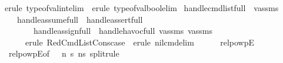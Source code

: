 \begin{isabellebody}
\ {\isacharparenleft}{\kern0pt}erule\ type{\isacharunderscore}{\kern0pt}of{\isacharunderscore}{\kern0pt}val{\isacharunderscore}{\kern0pt}int{\isacharunderscore}{\kern0pt}elim\ {\isacharbar}{\kern0pt}\ erule\ type{\isacharunderscore}{\kern0pt}of{\isacharunderscore}{\kern0pt}val{\isacharunderscore}{\kern0pt}bool{\isacharunderscore}{\kern0pt}elim{\isacharparenright}{\kern0pt}\isanewline
{\isacharparenright}{\kern0pt}\isanewline
\isanewline
{}\isamarkupfalse%
\ handle{\isacharunderscore}{\kern0pt}cmd{\isacharunderscore}{\kern0pt}list{\isacharunderscore}{\kern0pt}full\ \ v{\isacharunderscore}{\kern0pt}assms\ {\isacharequal}{\kern0pt}\ \isanewline
{\isacharparenleft}{\kern0pt}\isanewline
\ \ {\isacharparenleft}{\kern0pt}{\isacharparenleft}{\kern0pt}\ {\isacharparenleft}{\kern0pt}\ handle{\isacharunderscore}{\kern0pt}assume{\isacharunderscore}{\kern0pt}full\ {\isacharbar}{\kern0pt}\ handle{\isacharunderscore}{\kern0pt}assert{\isacharunderscore}{\kern0pt}full\ {\isacharbar}{\kern0pt}\isanewline
\ \ \ \ \ \ \ \ handle{\isacharunderscore}{\kern0pt}assign{\isacharunderscore}{\kern0pt}full\ {\isacharbar}{\kern0pt}\ {\isacharparenleft}{\kern0pt}handle{\isacharunderscore}{\kern0pt}havoc{\isacharunderscore}{\kern0pt}full\ v{\isacharunderscore}{\kern0pt}assms{\isacharcolon}{\kern0pt}\ v{\isacharunderscore}{\kern0pt}assms{\isacharparenright}{\kern0pt}{\isacharparenright}{\kern0pt}{\isacharcomma}{\kern0pt}\isanewline
\ \ \ \ \ \ {\isacharparenleft}{\kern0pt}erule\ RedCmdListCons{\isacharunderscore}{\kern0pt}case\ {\isacharbar}{\kern0pt}\ erule\ nil{\isacharunderscore}{\kern0pt}cmd{\isacharunderscore}{\kern0pt}elim{\isacharparenright}{\kern0pt}\ {\isacharparenright}{\kern0pt}\isanewline
\ \ \ {\isacharparenright}{\kern0pt}{\isacharplus}{\kern0pt}\isanewline
{\isacharparenright}{\kern0pt}\isanewline
\isanewline
{}\isamarkupfalse%
\isanewline
\isanewline
\isanewline
{}\isamarkupfalse%
\ relpowp{\isacharunderscore}{\kern0pt}E{}{\isacharunderscore}{\kern0pt}{}\ {\isacharequal}{\kern0pt}\isanewline
\ \ relpowp{\isacharunderscore}{\kern0pt}E{}{\isacharbrackleft}{\kern0pt}of\ {\isacharunderscore}{\kern0pt}\ {\isacharunderscore}{\kern0pt}\ {\isachardoublequoteopen}{\isacharparenleft}{\kern0pt}n{\isacharprime}{\kern0pt}{\isacharcomma}{\kern0pt}\ s{\isacharprime}{\kern0pt}{\isacharparenright}{\kern0pt}{\isachardoublequoteclose}\ {\isachardoublequoteopen}{\isacharparenleft}{\kern0pt}n{\isacharprime}{\kern0pt}{\isacharprime}{\kern0pt}{\isacharcomma}{\kern0pt}s{\isacharprime}{\kern0pt}{\isacharprime}{\kern0pt}{\isacharparenright}{\kern0pt}{\isachardoublequoteclose}{\isacharcomma}{\kern0pt}\ split{\isacharunderscore}{\kern0pt}rule{\isacharbrackright}{\kern0pt}\isanewline
%
\isadelimtheory
\isanewline
%
\endisadelimtheory
%
\isatagtheory
{}\isamarkupfalse%
%
\endisatagtheory
{\isafoldtheory}%
%
\isadelimtheory
%
\endisadelimtheory
%
\end{isabellebody}%
